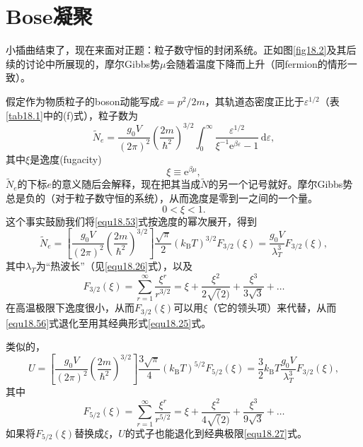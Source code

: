 \section{Bose凝聚}\label{sec18.7}
小插曲结束了，现在来面对正题：粒子数守恒的封闭系统。正如图\ref{fig18.2}及其后续的讨论中所展现的，摩尔Gibbs势$\mu$会随着温度下降而上升（同fermion的情形一致）。

假定作为物质粒子的boson动能写成$\varepsilon=p^2/2m$，其轨道态密度正比于$\varepsilon^{1/2}$（表\ref{tab18.1}中的(f)式），粒子数为
\begin{equation}
\tilde N_e = \frac{g_0V}{(2\pi)^2}\left(\frac{2m}{\hbar^2}\right)^{3/2}\int_0^\infty \frac{\varepsilon^{1/2}}{\xi^{-1}\mathrm e^{\beta\varepsilon}-1}\,\mathrm d\varepsilon,
\label{equ18.53}
\end{equation}
其中$\xi$是逸度(fugacity)
\begin{equation}
\xi \equiv\mathrm e^{\beta\mu},
\end{equation}
$\tilde N_e$的下标$e$的意义随后会解释，现在把其当成$\tilde N$的另一个记号就好。摩尔Gibbs势总是负的（对于粒子数守恒的系统），从而逸度是零到一之间的一个量。
\begin{equation}
0<\xi<1.
\end{equation}
这个事实鼓励我们将\eqref{equ18.53}式按逸度的幂次展开，得到
\begin{equation}
\tilde N_e=\left[\frac{g_0V}{(2\pi)^2}\left(\frac{2m}{\hbar^2}\right)^{3/2}\right]\frac{\sqrt{\pi}}{2}(k_\text{B}T)^{3/2}F_{3/2}(\xi)=\frac{g_0V}{\lambda_T^3}F_{3/2}(\xi),
\label{equ18.56}
\end{equation}
其中$\lambda_T$为``热波长''（见\eqref{equ18.26}式），以及
\begin{equation}
F_{3/2}(\xi)=\sum_{r=1}^\infty\frac{\xi^r}{r^{3/2}}=\xi+\frac{\xi^2}{2\sqrt(2)}+\frac{\xi^3}{3\sqrt{3}}+\dots
\label{equ18.57}
\end{equation}
在高温极限下逸度很小，从而$F_{3/2}(\xi)$可以用$\xi$（它的领头项）来代替，从而\eqref{equ18.56}式退化至用其经典形式\eqref{equ18.25}式。

类似的，
\begin{equation}
U=\left[\frac{g_0V}{(2\pi)^2}\left(\frac{2m}{\hbar^2}\right)^{3/2}\right]\frac{3\sqrt{\pi}}{4}(k_\text{B}T)^{5/2}F_{5/2}(\xi)=\frac{3}{2}k_\text{B}T\frac{g_0V}{\lambda_T^3}F_{3/2}(\xi),
\label{equ18.58}
\end{equation}
其中
\begin{equation}
F_{5/2}(\xi)=\sum_{r=1}^\infty\frac{\xi^r}{r^{5/2}}=\xi+\frac{\xi^2}{4\sqrt(2)}+\frac{\xi^3}{9\sqrt{3}}+\dots
\end{equation}
如果将$F_{5/2}(\xi)$替换成$\xi$，$U$的式子也能退化到经典极限\eqref{equ18.27}式。

